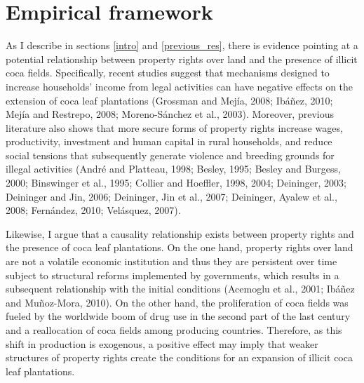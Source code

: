 \documentclass[a4paper, 12pt]{article}
\begin{document}
\section{Empirical framework}
\label{identification}

As I describe in sections \ref{intro} and \ref{previous_res}, there is  evidence pointing at a potential relationship between property rights over land and the presence of illicit coca fields. Specifically, recent studies suggest that mechanisms designed to increase households' income from legal activities can have negative effects on the extension of coca leaf plantations (Grossman and Mej\'{i}a, 2008; Ib\'{a}\~{n}ez, 2010; Mej\'{i}a and Restrepo, 2008; Moreno-S\'{a}nchez et al., 2003). Moreover, previous literature also shows that more secure forms of property rights increase wages, productivity, investment and human capital in rural households, and reduce social tensions that subsequently generate violence and breeding grounds for illegal activities (Andr\'{e} and Platteau, 1998; Besley, 1995; Besley and Burgess, 2000; Binswinger et al., 1995; Collier and Hoeffler, 1998, 2004; Deininger, 2003; Deininger and Jin, 2006; Deininger, Jin et al., 2007; Deininger, Ayalew et al., 2008; Fern\'{a}ndez, 2010; Vel\'{a}squez, 2007). 

Likewise, I argue that a causality relationship exists between property rights and the presence of coca leaf plantations. On the one hand, property rights over land are not a volatile economic institution and thus they are persistent over time subject to structural reforms implemented by governments, which results in a subsequent relationship with the initial conditions (Acemoglu et al., 2001; Ib\'{a}\~{n}ez and Mu\~{n}oz-Mora, 2010). On the other hand, the proliferation of coca fields was fueled by the worldwide boom of drug use in the second part of the last century and a reallocation of coca fields among producing countries. Therefore, as this shift in production is exogenous, a positive effect may imply that weaker structures of property rights create the conditions for an expansion of illicit coca leaf plantations.
\end{document}
